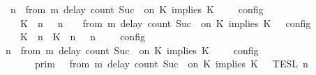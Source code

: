 \begin{isabellebody}
\ \ {\isacartoucheopen}{\isasymlbrakk}\ {\isasymGamma}{\isacharcomma}\ n\ {\isasymturnstile}\ {\isacharparenleft}{\isacharparenleft}from\ m\ delay\ count\ {\isacharparenleft}Suc\ {}{\isacharparenright}\ on\ K\ implies\ K\ {\isacharhash}\ {\isasymPsi}{\isacharparenright}\ {\isasymtriangleright}\ {\isasymPhi}\ {\isasymrbrakk}\isactrlsub c\isactrlsub o\isactrlsub n\isactrlsub f\isactrlsub i\isactrlsub g\isanewline
\ \ \ \ {\isacharequal}\ {\isasymlbrakk}\ {\isacharparenleft}{\isacharparenleft}K\ {\isasymnot}{\isasymUp}\ n{\isacharparenright}\ {\isacharhash}\ {\isasymGamma}{\isacharparenright}{\isacharcomma}\ n\ {\isasymturnstile}\ {\isasymPsi}\ {\isasymtriangleright}\ {\isacharparenleft}{\isacharparenleft}from\ m\ delay\ count\ {\isacharparenleft}Suc\ {}{\isacharparenright}\ on\ K\ implies\ K\ {\isacharhash}\ {\isasymPhi}{\isacharparenright}\ {\isasymrbrakk}\isactrlsub c\isactrlsub o\isactrlsub n\isactrlsub f\isactrlsub i\isactrlsub g\isanewline
\ \ \ \ {\isasymunion}\ {\isasymlbrakk}\ {\isacharparenleft}{\isacharparenleft}K\ {\isasymUp}\ n{\isacharparenright}\ {\isacharhash}\ {\isacharparenleft}K\ {\isasymUp}\ n{\isacharparenright}\ {\isacharhash}\ {\isasymGamma}{\isacharparenright}{\isacharcomma}\ n\ {\isasymturnstile}\ {\isasymPsi}\ {\isasymtriangleright}\ {\isasymPhi}\ {\isasymrbrakk}\isactrlsub c\isactrlsub o\isactrlsub n\isactrlsub f\isactrlsub i\isactrlsub g\isanewline
\ \ {\isacartoucheclose}\isanewline
%
\isadelimproof
%
\endisadelimproof
%
\isatagproof
{}\isamarkupfalse%
\ {\isacharminus}\isanewline
\ \ \isamarkupfalse%
\ {\isacartoucheopen}{\isasymlbrakk}\ {\isasymGamma}{\isacharcomma}\ n\ {\isasymturnstile}\ {\isacharparenleft}{\isacharparenleft}from\ m\ delay\ count\ {\isacharparenleft}Suc\ {}{\isacharparenright}\ on\ K\ implies\ K\ {\isacharhash}\ {\isasymPsi}{\isacharparenright}\ {\isasymtriangleright}\ {\isasymPhi}\ {\isasymrbrakk}\isactrlsub c\isactrlsub o\isactrlsub n\isactrlsub f\isactrlsub i\isactrlsub g\isanewline
\ \ \ \ \ \ {\isacharequal}\ {\isasymlbrakk}{\isasymlbrakk}\ {\isasymGamma}\ {\isasymrbrakk}{\isasymrbrakk}\isactrlsub p\isactrlsub r\isactrlsub i\isactrlsub m\ {\isasyminter}\ {\isasymlbrakk}{\isasymlbrakk}\ {\isacharparenleft}from\ m\ delay\ count\ {\isacharparenleft}Suc\ {}{\isacharparenright}\ on\ K\ implies\ K\ {\isacharhash}\ {\isasymPsi}\ {\isasymrbrakk}{\isasymrbrakk}\isactrlsub T\isactrlsub E\isactrlsub S\isactrlsub L\isactrlbsup {\isasymge}\ n\isactrlesup \isanewline

\end{isabellebody}
